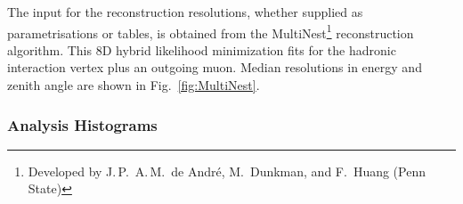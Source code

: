 The input for the reconstruction resolutions, whether supplied as
parametrisations or tables, is obtained from the
\textsf{MultiNest}\footnote{Developed by J.\,P.\ A.\,M.\ de Andr\'{e},
M.\ Dunkman, and F.\ Huang (Penn State)} reconstruction algorithm. This 8D
hybrid likelihood minimization fits for the hadronic interaction vertex plus an
outgoing muon. Median resolutions in energy and zenith angle are shown in
Fig.~\ref{fig:MultiNest}.


\subsubsection{Analysis Histograms}
\label{sec:simchain_ana}

